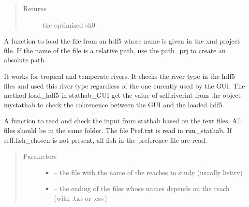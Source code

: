 \documentclass[letterpaper,10pt,english]{sphinxmanual}
\begin{document}
\begin{fulllineitems}
\begin{fulllineitems}
\begin{quote}
\begin{description}
\item[{Returns}] \leavevmode
the optimized sh0

\end{description}\end{quote}

\end{fulllineitems}


\begin{fulllineitems}
\label{\detokenize{index:src.stathab_c.Stathab.load_stathab_from_hdf5}}
A function to load the file from an hdf5 whose name is given in the xml project file. If the name of the
file is a relative path, use the path\_prj to create an absolute path.

It works for tropical and temperate rivers. It checks the river type in the hdf5  files and
used this river type regardless of the one curently used by the GUI. The method load\_hdf5 in stathab\_GUI
get the value of self.riverint from the object mystathab to check the cohrenence between the GUI and the loaded
hdf5.

\end{fulllineitems}


\begin{fulllineitems}
\label{\detokenize{index:src.stathab_c.Stathab.load_stathab_from_txt}}
A function to read and check the input from stathab based on the text files.
All files should be in the same folder.
The file Pref.txt is read in run\_stathab.
If self.fish\_chosen is not present, all fish in the preference file are read.
\begin{quote}\begin{description}
\item[{Parameters}] \leavevmode\begin{itemize}
\item {} 
 -- the file with the name of the reaches to study (usually listirv)

\item {} 
 -- the ending of the files whose names depends on the reach (with .txt or .csv)


\end{itemize}
\end{description}
\end{quote}
\end{fulllineitems}
\end{fulllineitems}
\end{document}
